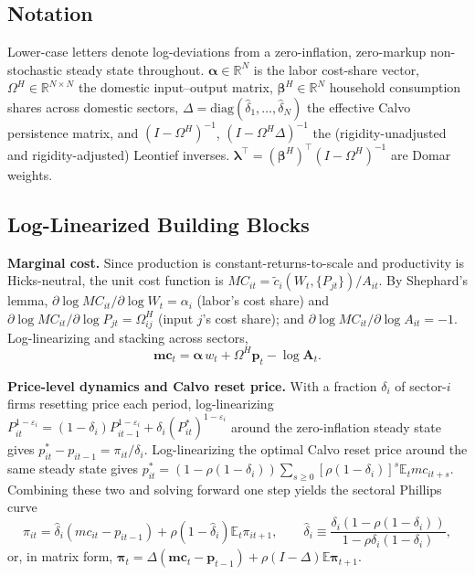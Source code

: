 \documentclass[12pt]{article}
\begin{document}
\subsection{Notation}

Lower-case letters denote log-deviations from a zero-inflation, zero-markup non-stochastic steady
state throughout. $\bm\alpha\in\mathbb R^N$ is the labor cost-share vector, $\Omega^H\in\mathbb
R^{N\times N}$ the domestic input--output matrix, $\bm\beta^H\in\mathbb R^N$ household consumption
shares across domestic sectors, $\Delta=\mathrm{diag}(\hat\delta_1,\ldots,\hat\delta_N)$ the effective
Calvo persistence matrix, and $(I-\Omega^H)^{-1}$, $(I-\Omega^H\Delta)^{-1}$ the (rigidity-unadjusted
and rigidity-adjusted) Leontief inverses. $\bm\lambda^\top=(\bm\beta^H)^\top(I-\Omega^H)^{-1}$ are
Domar weights.

\subsection{Log-Linearized Building Blocks}

\textbf{Marginal cost.} Since production is constant-returns-to-scale and productivity is
Hicks-neutral, the unit cost function is $MC_{it}=\tilde c_i(W_t,\{P_{jt}\})/A_{it}$. By Shephard's
lemma, $\partial\log MC_{it}/\partial\log W_t=\alpha_i$ (labor's cost share) and
$\partial\log MC_{it}/\partial\log P_{jt}=\Omega^H_{ij}$ (input $j$'s cost share); and
$\partial\log MC_{it}/\partial\log A_{it}=-1$. Log-linearizing and stacking across sectors,
\begin{equation}
    \bm{mc}_t = \bm\alpha\,w_t + \Omega^H\bm p_t - \log\mathbf A_t. \label{app:eq:mc}
\end{equation}

\textbf{Price-level dynamics and Calvo reset price.} With a fraction $\delta_i$ of sector-$i$ firms
resetting price each period, log-linearizing $P_{it}^{1-\varepsilon_i}=(1-\delta_i)P_{it-1}^{1-\varepsilon_i}
+\delta_i(P_{it}^*)^{1-\varepsilon_i}$ around the zero-inflation steady state gives
$p_{it}^*-p_{it-1}=\pi_{it}/\delta_i$. Log-linearizing the optimal Calvo reset price around the same
steady state gives $p_{it}^*=(1-\rho(1-\delta_i))\sum_{s\ge0}[\rho(1-\delta_i)]^s\mathbb E_tmc_{it+s}$.
Combining these two and solving forward one step yields the sectoral Phillips curve
\begin{equation}
    \pi_{it} = \hat\delta_i(mc_{it}-p_{it-1}) + \rho(1-\hat\delta_i)\mathbb E_t\pi_{it+1},
    \qquad
    \hat\delta_i \equiv \frac{\delta_i(1-\rho(1-\delta_i))}{1-\rho\delta_i(1-\delta_i)},
    \label{app:eq:pilaw}
\end{equation}
or, in matrix form, $\bm\pi_t=\Delta(\bm{mc}_t-\bm p_{t-1})+\rho(I-\Delta)\mathbb E\bm\pi_{t+1}$.
\end{document}
